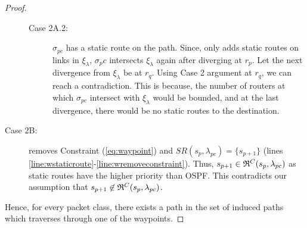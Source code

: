 \begin{proof}
\begin{description}
\begin{description}
			\item[Case 2A.2:]
			$\sigma_{pc}$ has a static route on the path. Since, 
			only adds static routes on links in $\xi_\lambda$, $\sigma_pc$ intersects $\xi_\lambda$
			again after diverging at $r_{p}$. Let the next divergence from $\xi_\lambda$ be at $r_{q}$.
			Using Case 2 argument at $r_{q}$, we can reach a contradiction. This is because, the number
			of routers at which $\sigma_{pc}$ intersect with $\xi_\lambda$ would be bounded, and at the last
			divergence, there would be no static routes to the destination.
		 
\end{description}
	\item[Case 2B:]
	 removes Constraint (\ref{eq:waypoint}) 
	and $SR(s_p, \lambda_{pc}) = \{s_{p+1}\}$ (lines \ref{line:wstaticroute}-\ref{line:wremoveconstraint}). 
	Thus, $s_{p+1} \in \mathfrak{R}^C(s_{p}, \lambda_{pc})$ as static routes 
	have the higher priority than OSPF. This contradicts our assumption
	that $s_{p+1} \not\in \mathfrak{R}^C(s_{p}, \lambda_{pc})$. 
	\end{description}
	
	Hence, for every packet class, 
	there exists a path in the set of induced paths which traverses through one of the waypoints. 
	\end{proof}
